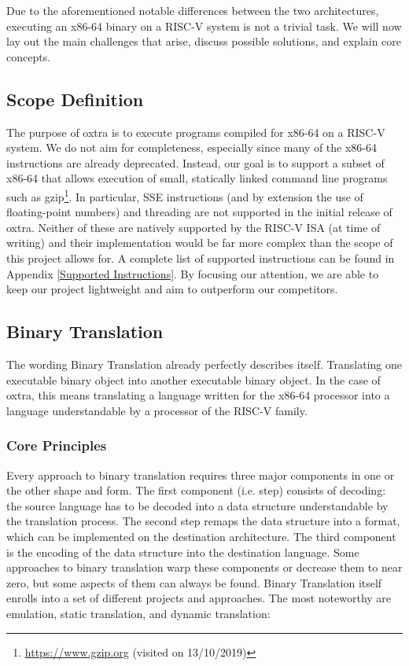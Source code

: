 Due to the aforementioned notable differences between the two architectures, executing an x86-64 binary on a RISC-V system is not a trivial task. We will now lay out the main challenges that arise, discuss possible solutions, and explain core concepts.

\subsection{Scope Definition}
The purpose of oxtra is to execute programs compiled for x86-64 on a RISC-V system. We do not aim for completeness, especially since many of the x86-64 instructions are already deprecated. Instead, our goal is to support a subset of x86-64 that allows execution of small, statically linked command line programs such as gzip\footnote{\url{https://www.gzip.org} (visited on 13/10/2019)}. In particular, SSE instructions (and by extension the use of floating-point numbers) and threading are not supported in the initial release of oxtra. Neither of these are natively supported by the RISC-V ISA (at time of writing) and their implementation would be far more complex than the scope of this project allows for. A complete list of supported instructions can be found in Appendix \ref{Supported Instructions}.
By focusing our attention, we are able to keep our project lightweight and aim to outperform our competitors.

\subsection{Binary Translation}
	The wording Binary Translation already perfectly describes itself. Translating one executable binary object into another executable binary object. In the case of oxtra, this means translating a language written for the x86-64 processor into a language understandable by a processor of the RISC-V family. 

	\subsubsection{Core Principles}
		Every approach to binary translation requires three major components in one or the other shape and form. The first component (i.e. step) consists of decoding: the source language has to be decoded into a data structure understandable by the translation process. The second step remaps the data structure into a format, which can be implemented on the destination architecture. The third component is the encoding of the data structure into the destination language. Some approaches to binary translation warp these components or decrease them to near zero, but some aspects of them can always be found.
		Binary Translation itself enrolls into a set of different projects and approaches. The most noteworthy are emulation, static translation, and dynamic translation:

